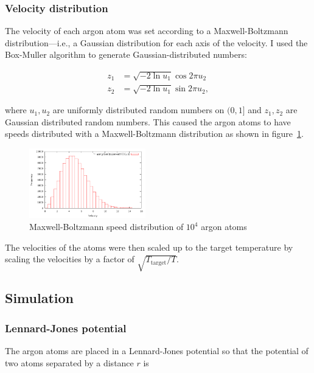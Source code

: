 \documentclass[twocolumn]{revtex4}
\begin{document}
\subsubsection{Velocity distribution}

The velocity of each argon atom was set according to a Maxwell-Boltzmann distribution---i.e., a Gaussian distribution for each axis of the velocity. I used the Box-Muller algorithm to generate Gaussian-distributed numbers:

\begin{align}
z_1 &= \sqrt{-2 \ln u_1} \cos{2 \pi u_2}\\
z_2 &= \sqrt{-2 \ln u_1} \sin{2 \pi u_2},
\end{align}

where $u_1, u_2$ are uniformly distributed random numbers on $(0,1]$ and $z_1, z_2$ are Gaussian distributed random numbers. This caused the argon atoms to have speeds distributed with a Maxwell-Boltzmann distribution as shown in figure~\ref{fig:vel-dist}.

\begin{figure}[htb]
\begin{center}
\leavevmode
\includegraphics[width=0.45\textwidth]{vel-dist.png}
\end{center}
\caption{Maxwell-Boltzmann speed distribution of $10^4$ argon atoms}
\label{fig:vel-dist}
\end{figure}

The velocities of the atoms were then scaled up to the target temperature by scaling the velocities by a factor of $\sqrt{T_{\text{target}}/T}$.

\subsection{Simulation}

\subsubsection{Lennard-Jones potential}

The argon atoms are placed in a Lennard-Jones potential so that the potential of two atoms separated by a distance $r$ is
\end{document}
